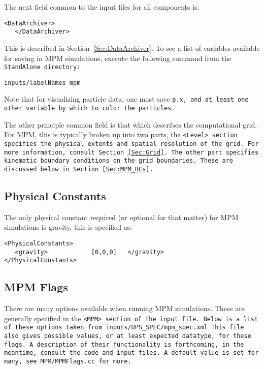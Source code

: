 The next field common to the input files for all components is:

\begin{Verbatim}[fontsize=\footnotesize]
   <DataArchiver>
   </DataArchiver>
\end{Verbatim}
This is described in Section~\ref{Sec:DataArchiver}.  To see a list of
variables available for saving in MPM simulations, execute the following
command from the \tt StandAlone \normalfont directory:

\begin{Verbatim}[fontsize=\footnotesize]
inputs/labelNames mpm
\end{Verbatim}
Note that for visualizing particle data, one must save \tt p.x, \normalfont
and at least one other variable by which to color the particles.

The other principle common field is that which describes the computational
grid.  For MPM, this is typically broken up into two parts, the
\tt <Level> \normalfont section specifies the physical extents and spatial
resolution of the grid.  For more information, consult Section~\ref{Sec:Grid}.
The other part specifies kinematic boundary conditions on the grid boundaries.
These are discussed below in Section~\ref{Sec:MPM_BCs}.

\subsection{Physical Constants} \label{Sec:physicalConstants}
The only physical constant required (or optional for that matter) for
MPM simulations is gravity, this is specified as:

\begin{Verbatim}[fontsize=\footnotesize]
<PhysicalConstants>
   <gravity>            [0,0,0]   </gravity>
</PhysicalConstants>
\end{Verbatim}

\subsection{MPM Flags} \label{Sec:MPMFlags}

There are many options available when running MPM simulations.  These
are generally specified in the \tt <MPM> \normalfont section of the input file.
Below is a list of these options taken from
\tt inputs/UPS\_SPEC/mpm\_spec.xml \normalfont 
This file also gives possible values, or at least expected datatype,
for these flags.  A description of their functionality is forthcoming,
in the meantime, consult the code and input files.  A default value is
set for many, see \tt MPM/MPMFlags.cc \normalfont for more.

